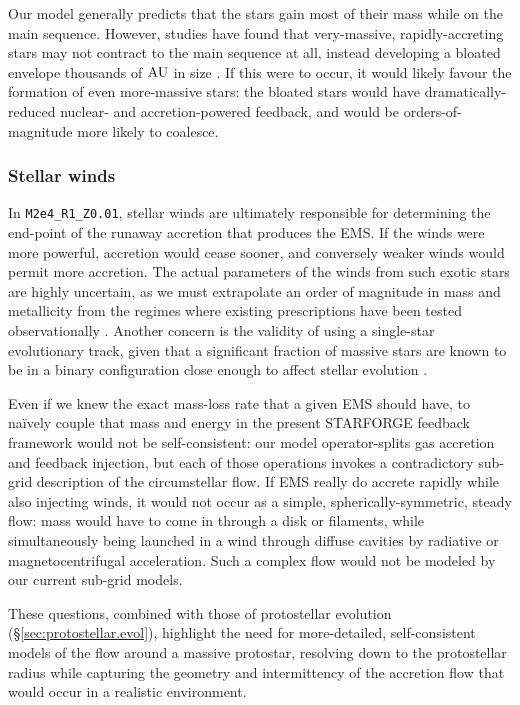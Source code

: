 \documentclass[apjl,twocolumn]{openjournal}
\begin{document}
Our model generally predicts that the stars gain most of their mass while on the main sequence. However, studies have found that very-massive, rapidly-accreting stars may not contract to the main sequence at all, instead developing a bloated envelope thousands of $\rm AU$ in size \citep{hosokawa:2012.protostellar.evol}. If this were to occur, it would likely favour the formation of even more-massive stars: the bloated stars would have dramatically-reduced nuclear- and accretion-powered feedback, and would be orders-of-magnitude more likely to coalesce.

\subsubsection{Stellar winds}
\label{sec:stellarwinds}
In \texttt{M2e4\_R1\_Z0.01}, stellar winds are ultimately responsible for determining the end-point of the runaway accretion that produces the EMS. If the winds were more powerful, accretion would cease sooner, and conversely weaker winds would permit more accretion. The actual parameters of the winds from such exotic stars are highly uncertain, as we must extrapolate an order of magnitude in mass and metallicity from the regimes where existing prescriptions have been tested observationally \citep{sabhahit:2022.vms.mass.loss}. Another concern is the validity of using a single-star evolutionary track, given that a significant fraction of massive stars are known to be in a binary configuration close enough to affect stellar evolution \citep{sana:2012.binary.evol}.

Even if we knew the exact mass-loss rate that a given EMS should have, to na\"{i}vely couple that mass and energy in the present STARFORGE feedback framework would not be self-consistent: our model operator-splits gas accretion and feedback injection, but each of those operations invokes a contradictory sub-grid description of the circumstellar flow. If EMS really do accrete rapidly while also injecting winds, it would not occur as a simple, spherically-symmetric, steady flow: mass would have to come in through a disk or filaments, while simultaneously being launched in a wind through diffuse cavities by radiative or magnetocentrifugal acceleration. Such a complex flow would not be modeled by our current sub-grid models.

These questions, combined with those of protostellar evolution (\S\ref{sec:protostellar.evol}), highlight the need for more-detailed, self-consistent models of the flow around a massive protostar, resolving down to the protostellar radius while capturing the geometry and intermittency of the accretion flow that would occur in a realistic environment.
\end{document}

